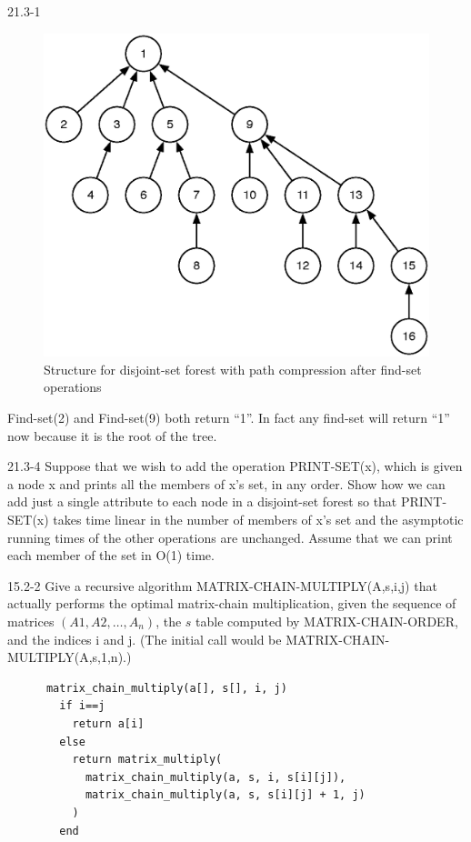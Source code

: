 \begin{problem}{21.3-1}
\begin{solution}
\begin{figure}[H]
    \end{figure}
    \begin{figure}[H]
      \centering
      \caption{Structure for disjoint-set forest with path compression after find-set operations}
      \includegraphics[scale=.5]{21_3_1_4.eps}
    \end{figure}
    Find-set(2) and Find-set(9) both return ``1''. In fact any find-set will return ``1'' now because it is the root of
    the tree.
  \end{solution}
\end{problem}

\begin{problem}{21.3-4}
  Suppose that we wish to add the operation PRINT-SET(x), which is given a node x and prints all the members of x's set,
  in any order. Show how we can add just a single attribute to each node in a disjoint-set forest so that PRINT-SET(x)
  takes time linear in the number of members of x's set and the asymptotic running times of the other operations are
  unchanged. Assume that we can print each member of the set in O(1) time.
\end{problem}

\begin{problem}{15.2-2}
  Give a recursive algorithm MATRIX-CHAIN-MULTIPLY(A,s,i,j) that actually performs the optimal matrix-chain
  multiplication, given the sequence of matrices $(A1, A2, \ldots, A_n)$, the $s$ table computed by MATRIX-CHAIN-ORDER, and
  the indices i and j. (The initial call would be MATRIX-CHAIN-MULTIPLY(A,s,1,n).)
  \begin{solution}
    \begin{lstlisting}
      matrix_chain_multiply(a[], s[], i, j)
        if i==j
          return a[i]
        else
          return matrix_multiply(
            matrix_chain_multiply(a, s, i, s[i][j]),
            matrix_chain_multiply(a, s, s[i][j] + 1, j)
          )
        end
    \end{lstlisting}
  \end{solution}
\end{problem}

